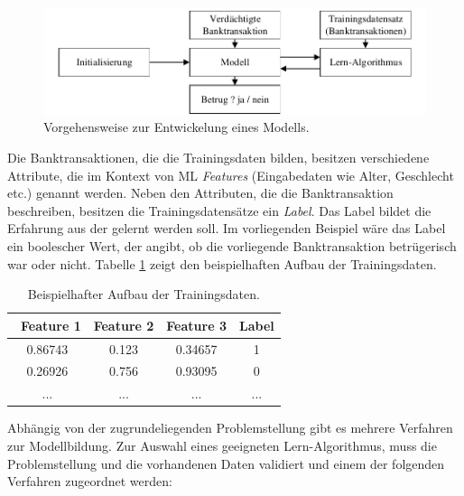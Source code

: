 \begin{figure}[ht]
\centering
\includegraphics{images/lernprozess.pdf}
\caption{Vorgehensweise zur Entwickelung eines Modells.}
\label{fig:lernprozess}
\end{figure}  

Die Banktransaktionen, die die Trainingsdaten bilden, besitzen verschiedene Attribute, die im Kontext von ML \emph{Features} (Eingabedaten wie Alter, Geschlecht etc.) genannt werden. Neben den Attributen, die die Banktransaktion beschreiben, besitzen die Trainingsdatensätze ein \emph{Label}. Das Label bildet die Erfahrung aus der gelernt werden soll. Im vorliegenden Beispiel wäre das Label ein boolescher Wert, der angibt, ob die vorliegende Banktransaktion betrügerisch war oder nicht. Tabelle \ref{tab:trainingset} zeigt den beispielhaften Aufbau der Trainingsdaten.

\begin{table}[ht]
\centering
\small
\begin{tabular}{cccc}
\toprule
\ Feature 1 & Feature 2 & Feature 3 & Label\\
\toprule
0.86743 & 0.123 & 0.34657 & 1\\\midrule
0.26926 & 0.756 & 0.93095 & 0\\\midrule
... & ... & ... & ...\\\bottomrule
\end{tabular}
\caption{Beispielhafter Aufbau der Trainingsdaten.}
\label{tab:trainingset}
\end{table}

Abhängig von der zugrundeliegenden Problemstellung gibt es mehrere Verfahren zur Modellbildung. Zur Auswahl eines geeigneten Lern-Algorithmus, muss die Problemstellung und die vorhandenen Daten validiert und einem der folgenden Verfahren zugeordnet werden:  

